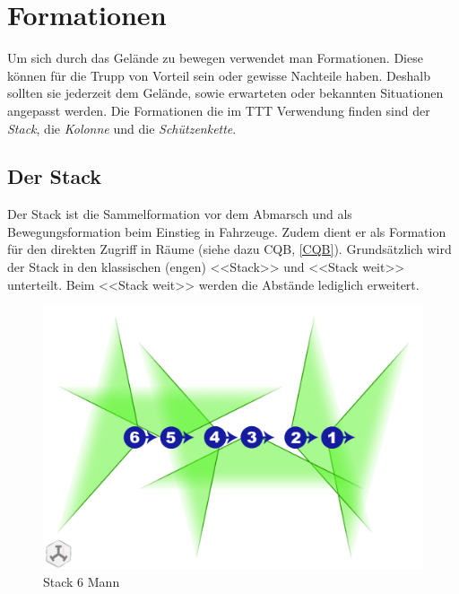 \section{Formationen}
Um sich durch das Gelände zu bewegen verwendet man Formationen. Diese können für die Trupp von Vorteil sein oder gewisse Nachteile haben. Deshalb sollten sie jederzeit dem Gelände, sowie erwarteten oder bekannten Situationen angepasst werden. Die Formationen die im TTT Verwendung finden sind der \textit{Stack}, die \textit{Kolonne} und die \textit{Schützenkette}. 

\subsection{Der Stack}
Der Stack ist die Sammelformation vor dem Abmarsch und als Bewegungsformation beim Einstieg in Fahrzeuge. Zudem dient er als Formation für den direkten Zugriff in Räume (siehe dazu CQB, \autoref{CQB}). Grundsätzlich wird der Stack in den klassischen (engen) <<Stack>> und <<Stack weit>> unterteilt. Beim <<Stack weit>> werden die Abstände lediglich erweitert.
\begin{figure}[h]
	\centering
	\includegraphics[width=0.7\linewidth]{./img/grundlagen/formationen/stack_6mann}
	\caption{Stack 6 Mann}
\end{figure}\\

